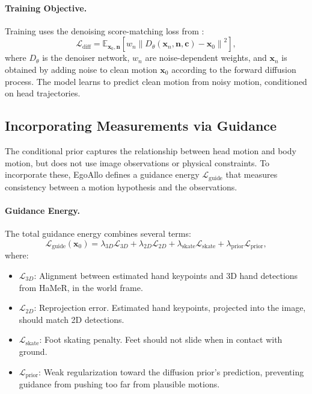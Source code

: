 \documentclass[../../book-main.tex]{subfiles}
\begin{document}
\paragraph{Training Objective.}
Training uses the denoising score-matching loss from :
\begin{equation}
\mathcal{L}_{\text{diff}} = \mathbb{E}_{\boldsymbol{x}_0,
\boldsymbol{n}} \left[ w_n
\left\| D_\theta(\boldsymbol{x}_n, \boldsymbol{n}, \boldsymbol{c}) -
\boldsymbol{x}_0 \right\|^2 \right],
\end{equation}
where $D_\theta$ is the denoiser network, $w_n$ are noise-dependent
weights, and $\boldsymbol{x}_n$ is obtained by adding noise to clean motion
$\boldsymbol{x}_0$ according to the forward diffusion process. The model
learns to predict clean motion from noisy motion, conditioned on head
trajectories.

\subsection{Incorporating Measurements via Guidance}
\label{sub:egoallo_guidance}

The conditional prior captures the relationship between head motion
and body motion, but does not use image observations or physical
constraints. To incorporate these, EgoAllo defines a guidance energy
$\mathcal{L}_{\text{guide}}$ that measures consistency between a
motion hypothesis and the observations.

\paragraph{Guidance Energy.}
The total guidance energy combines several terms:
\begin{equation}
\mathcal{L}_{\text{guide}}(\boldsymbol{x}_0) =
\lambda_{3D}\mathcal{L}_{3D} + \lambda_{2D}\mathcal{L}_{2D} +
\lambda_{\text{skate}}\mathcal{L}_{\text{skate}} +
\lambda_{\text{prior}}\mathcal{L}_{\text{prior}},
\end{equation}
where:
\begin{itemize}
\item $\mathcal{L}_{3D}$: Alignment between estimated hand
keypoints and 3D hand detections from HaMeR, in the world frame.
\item $\mathcal{L}_{2D}$: Reprojection error. Estimated hand
keypoints, projected into the image, should match 2D detections.
\item $\mathcal{L}_{\text{skate}}$: Foot skating penalty. Feet
should not slide when in contact with ground.
\item $\mathcal{L}_{\text{prior}}$: Weak regularization toward
the diffusion prior's prediction, preventing guidance from
pushing too far from plausible motions.
\end{itemize}
\end{document}

